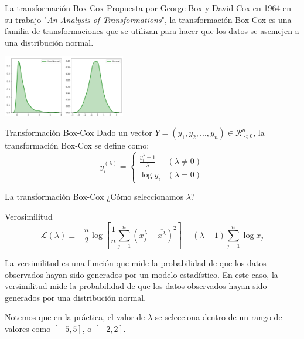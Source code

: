 \documentclass{beamer}
\begin{document}
\begin{frame}{La transformación Box-Cox}
    Propuesta por George Box y David Cox en 1964 en su trabajo "\textit{An Analysis of Transformations}", la transformación Box-Cox es una familia de transformaciones que se utilizan para hacer que los datos se asemejen a una distribución normal.
    \pause
    \begin{center}
        \includegraphics[width=0.4\textwidth]{output275.png}
    \end{center}
    \pause
    \begin{block}{Transformación Box-Cox}
        Dado un vector $Y=(y_1, y_2, ..., y_n)\in\mathcal{R}_{<0}^n$, la transformación Box-Cox se define como:
        \begin{equation*}
            y_i^{(\lambda)}= \begin{cases}\frac{y_i^{\lambda}-1}{\lambda} & (\lambda \neq 0) \\ \log y_i & (\lambda=0)\end{cases}
        \end{equation*}
    \end{block}
\end{frame}

\begin{frame}{La transformación Box-Cox}
    ¿Cómo seleccionamos $\lambda$?

    \pause
    \begin{block}{Verosimilitud}
        \begin{equation*}
            \mathcal{L}(\lambda) \equiv-\frac{n}{2} \log \left[\frac{1}{n} \sum_{j=1}^{n}\left(x_{j}^{\lambda}-\overline{x^{\lambda}}\right)^{2}\right] +(\lambda-1) \sum_{j=1}^{n} \log x_{j}
        \end{equation*}
    \end{block}
    \pause
    La versimilitud es una función que mide la probabilidad de que los datos observados hayan sido generados por un modelo estadístico. En este caso, la versimilitud mide la probabilidad de que los datos observados hayan sido generados por una distribución normal.

    Notemos que en la práctica, el valor de $\lambda$ se selecciona dentro de un rango de valores como $[-5, 5]$, o $[-2, 2]$.
\end{frame}
\end{document}
